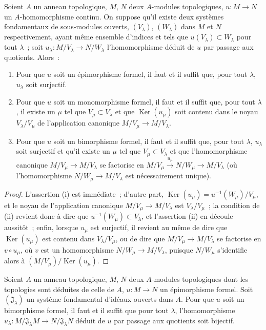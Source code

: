 \begin{proposition}[19.1.3]
\label{0.19.1.3-fr}
Soient $A$ un anneau topologique, $M$, $N$ deux $A$-modules topologiques,
$u:M\to N$ un $A$-homomorphisme continu. On suppose qu'il existe deux systèmes
fondamentaux de sous-modules ouverts, $(V_\lambda)$, $(W_\lambda)$ dans $M$ et
$N$ respectivement, ayant même ensemble d'indices et tels que
$u(V_\lambda)\subset W_\lambda$ pour tout $\lambda$~; soit
$u_\lambda:M/V_\lambda\to N/W_\lambda$ l'homomorphisme déduit de $u$ par
passage aux quotients. Alors~:
\begin{enumerate}
  \item[\textup{(i)}] Pour que $u$ soit un épimorphisme formel, il faut et il suffit que,
  pour tout $\lambda$, $u_\lambda$ soit surjectif.
  \item[\textup{(ii)}] Pour que $u$ soit un monomorphisme formel, il faut et il suffit
  que, pour tout $\lambda$, il existe un $\mu$ tel que
  $V_\mu\subset V_\lambda$ et que $\operatorname{Ker}(u_\mu)$ soit contenu
  dans le noyau $V_\lambda/V_\mu$ de l'application canonique
  $M/V_\mu\to M/V_\lambda$.
  \item[\textup{(iii)}] Pour que $u$ soit un bimorphisme formel, il faut et il suffit
  que, pour tout $\lambda$, $u_\lambda$ soit surjectif et qu'il existe un
  $\mu$ tel que $V_\mu\subset V_\lambda$ et que l'homomorphisme canonique
  $M/V_\mu\to M/V_\lambda$
  se factorise en
  $M/V_\mu\xrightarrow{u_\mu}N/W_\mu\to M/V_\lambda$ (où
  l'homomorphisme $N/W_\mu\to M/V_\lambda$ est nécessairement unique).
\end{enumerate}
\end{proposition}

\begin{proof}
L'assertion (i) est immédiate~; d'autre part,
$\operatorname{Ker}(u_\mu)=u^{-1}(W_\mu)/V_\mu$, et le noyau de l'application
canonique $M/V_\mu\to M/V_\lambda$ est $V_\lambda/V_\mu$~; la condition de
(ii) revient donc à dire que $u^{-1}(W_\mu)\subset V_\lambda$, et l'assertion
(ii) en découle aussitôt~; enfin, lorsque $u_\mu$ est surjectif, il revient au
même de dire que $\operatorname{Ker}(u_\mu)$ est contenu dans
$V_\lambda/V_\mu$, ou de dire que $M/V_\mu\to M/V_\lambda$ se factorise en
$v\circ u_\mu$, où $v$ est un homomorphisme
$N/W_\mu\to M/V_\lambda$, puisque $N/W_\mu$ s'identifie alors à
$(M/V_\mu)/\operatorname{Ker}(u_\mu)$.
\end{proof}

\begin{corollary}[19.1.4]
\label{0.19.1.4-fr}
Soient $A$ un anneau topologique, $M$, $N$ deux $A$-modules topologiques dont
les topologies sont déduites de celle de $A$, $u:M\to N$ un épimorphisme
formel. Soit $(\mathfrak J_\lambda)$ un système fondamental d'idéaux ouverts
dans $A$. Pour que $u$ soit un bimorphisme formel, il faut et il suffit que pour
tout $\lambda$, l'homomorphisme
$u_\lambda:M/\mathfrak J_\lambda M\to N/\mathfrak J_\lambda N$ déduit de $u$
par passage aux quotients soit bijectif.
\end{corollary}


